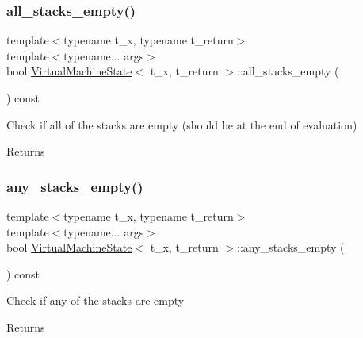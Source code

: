 \subsubsection{\texorpdfstring{all\+\_\+stacks\+\_\+empty()}{all\_stacks\_empty()}}
{\footnotesize\ttfamily template$<$typename t\+\_\+x, typename t\+\_\+return$>$ \\
template$<$typename... args$>$ \\
bool \hyperlink{class_virtual_machine_state}{Virtual\+Machine\+State}$<$ t\+\_\+x, t\+\_\+return $>$\+::all\+\_\+stacks\+\_\+empty (\begin{DoxyParamCaption}{ }\end{DoxyParamCaption}) const\hspace{0.3cm}{\ttfamily [inline]}}

Check if all of the stacks are empty (should be at the end of evaluation) \begin{DoxyReturn}{Returns}

\end{DoxyReturn}
\mbox{\label{class_virtual_machine_state_ae62e9afd2ae0922a1e77eb6822972b7c}} 
\subsubsection{\texorpdfstring{any\+\_\+stacks\+\_\+empty()}{any\_stacks\_empty()}}
{\footnotesize\ttfamily template$<$typename t\+\_\+x, typename t\+\_\+return$>$ \\
template$<$typename... args$>$ \\
bool \hyperlink{class_virtual_machine_state}{Virtual\+Machine\+State}$<$ t\+\_\+x, t\+\_\+return $>$\+::any\+\_\+stacks\+\_\+empty (\begin{DoxyParamCaption}{ }\end{DoxyParamCaption}) const\hspace{0.3cm}{\ttfamily [inline]}}

Check if any of the stacks are empty \begin{DoxyReturn}{Returns}

\end{DoxyReturn}
\mbox{\label{class_virtual_machine_state_a15659c007860b21ccb0cb15aa32d778a}} 
